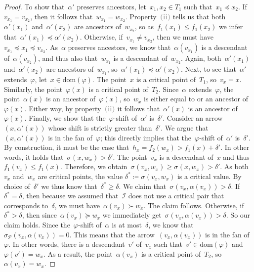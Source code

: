 \documentclass[11pt]{article}
\newcommand{\dom}{\mathrm{dom}}
\newcommand{\shift}[1]{\sigma_{#1}}
\renewcommand{\phi}{\varphi}
\newcommand{\I}{\mathcal{I}}
\renewcommand{\P}{\mathcal{P}}
\newcommand{\enumit}[1]{\textcolor{darkgray}{\sffamily\bfseries\upshape\mathversion{bold}#1}}
\begin{document}
\begin{proof}
To show that~$\alpha'$ preserves ancestors, let~$x_1, x_2 \in T_1$ such that~$x_1 \preceq x_2$.
If~$v_{x_1} = v_{x_2}$, then it follows that~$w_{x_1} = w_{x_2}$.
Property~\enumit{(ii)} tells us that both~$\alpha'(x_1)$ and~$\alpha'(x_2)$ are ancestors of~$w_{x_2}$, so as~$f_1(x_1) \le f_1(x_2)$ we infer that~$\alpha'(x_1) \preceq \alpha'(x_2)$.
Otherwise, if~$v_{x_1} \neq v_{x_2}$, then we must have~$v_{x_1} \preceq x_1 \preceq v_{x_2}$.
As~$\alpha$ preserves ancestors, we know that~$\alpha(v_{x_1})$ is a descendant of~$\alpha(v_{x_2})$, and thus also that~$w_{x_1}$ is a descendant of~$w_{x_2}$.
Again, both~$\alpha'(x_1)$ and~$\alpha'(x_2)$ are ancestors of~$w_{x_1}$, so~$\alpha'(x_1) \preceq \alpha'(x_2)$.
%
Next, to see that~$\alpha'$ extends~$\phi$, let~$x \in \dom(\phi)$.
The point~$x$ is a critical point of~$T_1$, so~$v_x = x$.
Similarly, the point~$\phi(x)$ is a critical point of~$T_2$.
Since~$\alpha$ extends~$\phi$, the point~$\alpha(x)$ is an ancestor of~$\phi(x)$, so~$w_x$ is either equal to or an ancestor of~$\phi(x)$.
Either way, by property~\enumit{(ii)} it follows that~$\alpha'(x)$ is an ancestor of~$\phi(x)$.
%
Finally, we show that the~$\phi$-shift of~$\alpha'$ is~$\delta'$.
Consider an arrow~$(x, \alpha'(x))$ whose shift is strictly greater than~$\delta'$.
We argue that~$(x, \alpha'(x))$ is in the fan of~$\phi$; this directly implies that the~$\phi$-shift of~$\alpha'$ is~$\delta'$.
By construction, it must be the case that~$h_x = f_2(w_x) > f_1(x) + \delta'$.
In other words, it holds that~$\shift{}(x, w_x) > \delta'$.
The point~$v_x$ is a descendant of~$x$ and thus~$f_1(v_x) \le f_1(x)$.
Therefore, we obtain~$\shift{}(v_x, w_x) \ge \shift{}(x, w_x) > \delta'$.
As both~$v_x$ and~$w_x$ are critical points, the value $\delta^* \coloneqq \shift{}(v_x, w_x)$ is a critical value.
By choice of~$\delta'$ we thus know that~$\delta^* \ge \delta$.
We claim that~$\shift{}(v_x, \alpha(v_x)) > \delta$.
If~$\delta^* = \delta$, then because we assumed that~$\I$ does not use a critical pair that corresponds to~$\delta$, we must have~$\alpha(v_x) \succ w_x$.
The claim follows.
Otherwise, if~$\delta^* > \delta$, then since~$\alpha(v_x) \succeq w_x$ we immediately get~$\shift{}(v_x, \alpha(v_x)) > \delta$.
So our claim holds.
%
Since the~$\phi$-shift of~$\alpha$ is at most~$\delta$, we know that~$\shift{\P}(v_x, \alpha(v_x)) = 0$.
This means that the arrow~$(v_x, \alpha(v_x))$ is in the fan of~$\phi$.
In other words, there is a descendant~$v'$ of~$v_x$ such that~$v' \in \dom(\phi)$ and~$\phi(v') = w_x$.
As a result, the point~$\alpha(v_x)$ is a critical point of~$T_2$, so~$\alpha(v_x) = w_x$.

\end{proof}
\end{document}
